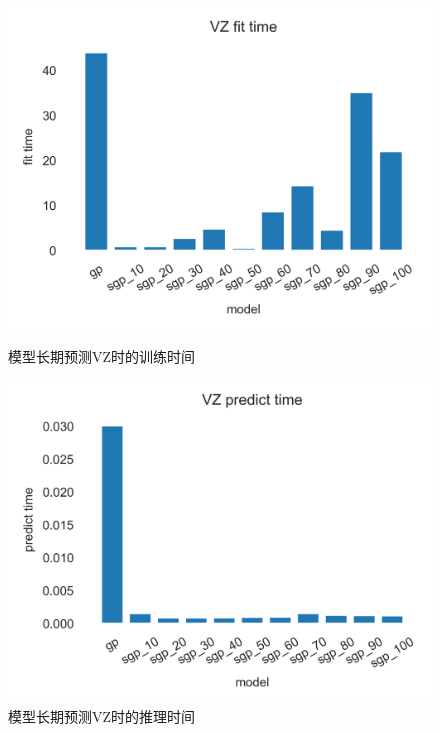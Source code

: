 \begin{figure}[!htbp]
    \centering
    \begin{minipage}[t]{0.49\textwidth}
    \centering
    \includegraphics[width=\textwidth]{images/lab1/VZ_fit_time.png}
    \caption{模型长期预测VZ时的训练时间}\label{1VZfittime}
    \end{minipage}
    \begin{minipage}[t]{0.49\textwidth}
    \centering
    \includegraphics[width=\textwidth]{images/lab1/VZ_predict_time.png}
    \caption{模型长期预测VZ时的推理时间}\label{1VZpredicttime}
    \end{minipage}
\end{figure}



